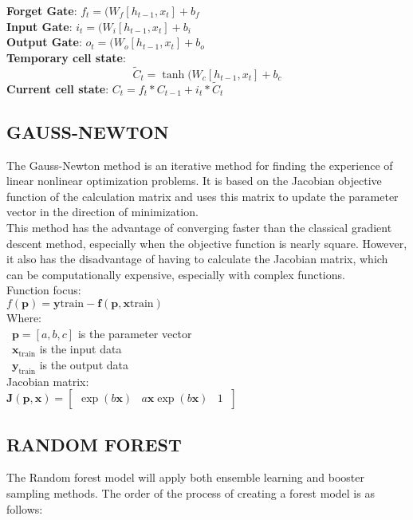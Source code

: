 \documentclass{ieeeojies}
\begin{document}
\noindent \textbf{Forget Gate}: $f_t = (W_f[h_{t-1}, x_t] + b_f$ \\
	\textbf{Input Gate}: $i_t = (W_i[h_{t-1}, x_t] + b_i$ \\
	\textbf{Output Gate}: $o_t = (W_o[h_{t-1}, x_t] + b_o$\\
	\textbf{Temporary cell state}: \[\tilde{C}_t = \tanh(W_c[h_{t-1}, x_t] + b_c\]
	\textbf{Current cell state}: $C_t = f_t * C_{t-1} + i_t * \tilde{C}_t$ \
 
\subsection{GAUSS-NEWTON}
\indent The Gauss-Newton method is an iterative method for finding the experience of linear nonlinear optimization problems. It is based on the Jacobian objective function of the calculation matrix and uses this matrix to update the parameter vector in the direction of minimization.\\
\indent This method has the advantage of converging faster than the classical gradient descent method, especially when the objective function is nearly square. However, it also has the disadvantage of having to calculate the Jacobian matrix, which can be computationally expensive, especially with complex functions.\\
\indent  Function focus: \\
\indent $f(\mathbf{p}) = \mathbf{y}\text{train} - \mathbf{f}(\mathbf{p}, \mathbf{x}\text{train})$
\\
Where:\\
\indent\textbullet\ $\mathbf{p} = [a, b, c]$ is the parameter vector\\
\indent\textbullet\ $\mathbf{x}_\text{train}$ is the input data\\
\indent\textbullet\ $\mathbf{y}_\text{train}$ is the output data\\

\indent Jacobian matrix:\\
\indent $\mathbf{J}(\mathbf{p}, \mathbf{x}) = \begin{bmatrix}
\exp(b \mathbf{x}) & a \mathbf{x} \exp(b \mathbf{x}) & 1 \
\end{bmatrix}$



\subsection{RANDOM FOREST}
\indent The Random forest model will apply both ensemble learning and booster sampling methods. The order of the process of creating a forest model is as follows:
\end{document}
